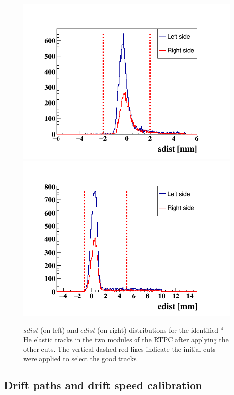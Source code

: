 \begin{figure}[tp]
\includegraphics[scale=0.34]{fig_rtpc/updates/sdist_elastic_1p2GeV.png}
\includegraphics[scale=0.34]{fig_rtpc/updates/edist_elastic_1p2GeV.png}
\caption{ $sdist$ (on left) and $edist$ (on right) distributions for the 
identified $^4$He elastic tracks in the two modules of the RTPC after applying 
the other cuts. The vertical dashed red lines indicate the initial cuts were 
applied to select the good tracks.}
\label{fig:2-sdist-edist}
\end{figure} 



\subsection{Drift paths and drift speed calibration}

